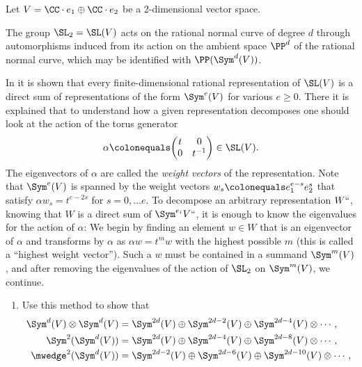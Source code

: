 \begin{exercise}\label{rnc and representations}
Let $V = \CC\cdot e_1\oplus \CC\cdot e_2$ be a 2-dimensional vector space.

The group $\SL_2= \SL (V)$ acts on the
rational normal curve
%
of degree $d$ through automorphisms induced from its action on
%
%
the ambient space $\PP^d$ of the rational normal curve, which may be identified with $\PP(\Sym^d(V))$.

In \cite[pp.\,146--150]{Fulton-Harris} it is shown that
 every finite-dimen\-sional rational
representation of $\SL(V)$ is a direct sum of representations of the
form $\Sym^e(V)$ for various $e\geq 0$.
There it is explained that to understand how a given representation decomposes one should look at the action of the
torus generator
%
$$
\alpha \colonequals \biggl(\begin{matrix}
t&0\\
0&t^{-1}
\end{matrix}
\biggr)
\in \SL(V).
$$
The eigenvectors of $\alpha$ are called the {\it weight vectors} of the representation.
%
Note that $\Sym^e(V)$ is spanned by the weight vectors
$w_s \colonequals e_1^{e-s} e_2^{s}$
that satisfy $\alpha w_s = t^{e-2s}$ for $s = 0, \dots e$.
To decompose an arbitrary representation $W` `$, knowing that $W$ is a direct sum of $\Sym^{e_i}V` `$, it is enough to know the
%
eigenvalues for the action of $\alpha$: We begin by finding an element $w\in W$ that
is an eigenvector of $\alpha$ and transforms by $\alpha$ as $\alpha w
= t^mw$ with the highest possible $m$ (this is called a ``highest
weight vector'').
Such a $w$
must be contained
in a summand $\Sym^m(V)$, and after removing the eigenvalues of the action of $\SL_2$ on $\Sym^m(V)$, we continue.
\begin{enumerate}
 \item Use this method to show that
%
\begin{align*}
 \Sym^d(V)\otimes \Sym^d(V)&= \Sym^{2d}(V) \oplus  \Sym^{2d-2}(V) \oplus \Sym^{2d-4}(V) \otimes\cdots,\\
 \Sym^2(\Sym^d(V))&= \Sym^{2d}(V) \oplus \Sym^{2d-4}(V)\oplus \Sym^{2d-8}(V)\otimes \cdots,\\[-1.5pt]
 \mwedge^2(\Sym^d(V))&= \Sym^{2d-2}(V) \oplus \Sym^{2d-6}(V)\oplus \Sym^{2d-10}(V)\otimes \cdots,
\end{align*}

\end{enumerate}
\end{exercise}
